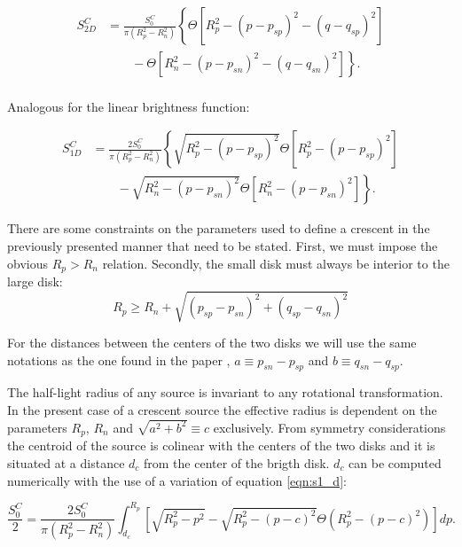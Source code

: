 \begin{align}
 S_{2D}^C &= \frac{S_0^C}{\pi \left(R_p^2-R_n^2 \right)} \left\{ \Theta \left[ R_p^2 - \left( p-p_{sp} \right)^2 - \left( q-q_{sp} \right)^2 \right] \right.\nonumber\\
 &\qquad \left. {} -  \Theta \left[ R_n^2 - \left( p-p_{sn} \right)^2 - \left( q-q_{sn} \right)^2 \right] \right\}.
\end{align}
\\
Analogous for the linear brightness function:

\begin{align}
 S_{1D}^C &= \frac{2 S_0^C}{\pi \left(R_p^2-R_n^2 \right)} \left\{ \sqrt{R_p^2 - (p-p_{sp})^2}  \Theta \left[ R_p^2 - \left( p-p_{sp} \right)^2 \right] \right.\nonumber\\
 &\qquad \left. {} - \sqrt{R_n^2 - (p-p_{sn})^2 } \Theta \left[ R_n^2 - \left( p-p_{sn} \right)^2 \right] \right\}.
\label{eqn:s1_d}
\end{align}


There are some constraints on the parameters used to define a crescent in the previously presented manner that need to be stated. First, we must impose the obvious $R_p > R_n$ relation. Secondly, 
the small disk must always be interior to the large disk:
\begin{equation}
 R_p \ge R_n + \sqrt{\left(p_{sp} - p_{sn} \right)^2 + \left(q_{sp} - q_{sn} \right)^2}
\end{equation}

For the distances between the centers of the two disks we will use the same notations as the one found in the paper \citep{2013MNRAS.434..765K}, $a \equiv p_{sn} - p_{sp}$ and $b \equiv q_{sn} - q_{sp}$.

The half-light radius of any source is invariant to any rotational transformation. In the present case of a crescent source the effective radius is dependent on the parameters $R_p$, $R_n$ and $\sqrt{a^2+b^2}\equiv c $ exclusively. From symmetry considerations the centroid of the source is colinear with the centers of the two disks and it is situated at a distance $d_c$ from the center of the brigth disk. $d_c$ can be computed numerically with the use of a variation of equation \ref{eqn:s1_d}:

\begin{equation}
\frac{S_0^C}{2} =  \frac{2 S_0^C}{\pi \left(R_p^2-R_n^2 \right)} \int_{d_c}^{R_p} \left[ \sqrt{R_p^2 - p^2} - \sqrt{R_p^2 - \left(p-c\right)^2} \Theta \left(R_p^2 - \left(p-c\right)^2 \right) \right] dp.
\end{equation}   

